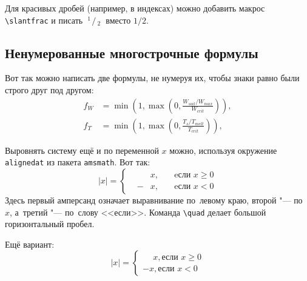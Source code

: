 \def\slantfrac#1#2{ \hspace{3pt}\!^{#1}\!\!\hspace{1pt}/
  \hspace{2pt}\!\!_{#2}\!\hspace{3pt}
} %
Для красивых дробей (например, в индексах) можно добавить макрос
\verb+\slantfrac+ и писать $\slantfrac{1}{2}$ вместо $1/2$.

\subsection{Ненумерованные многострочные формулы} \label{subsect1_3_2}

Вот так можно написать две формулы, не нумеруя их, чтобы знаки равно были строго друг под другом:
\begin{align}
  f_W & =  \min \left( 1, \max \left( 0, \frac{W_{soil} / W_{max}}{W_{crit}} \right)  \right), \nonumber \\
  f_T & =  \min \left( 1, \max \left( 0, \frac{T_s / T_{melt}}{T_{crit}} \right)  \right), \nonumber
\end{align}

Выровнять систему ещё и по переменной $ x $ можно, используя окружение \verb|alignedat| из пакета \verb|amsmath|. Вот так: 
\[
    |x| = \left\{
    \begin{alignedat}{2}
        &&x, \quad &\text{eсли } x\geqslant 0 \\
        &-&x, \quad & \text{eсли } x<0
    \end{alignedat}
    \right.
\]
Здесь первый амперсанд  означает выравнивание по~левому краю, второй "--- по~$ x $, а~третий "--- по~слову <<если>>. Команда \verb|\quad| делает большой горизонтальный пробел. 

Ещё вариант:
\[
    |x|=
    \begin{cases}
    \phantom{-}x, \text{если } x \geqslant 0 \\
    -x, \text{если } x<0
    \end{cases}
\]

